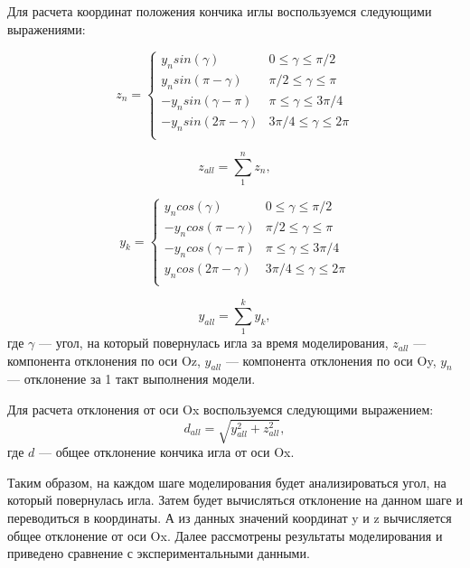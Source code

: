 \documentclass[10pt]{article}
\begin{document}
Для расчета координат положения кончика иглы воспользуемся следующими выражениями:

\begin{equation} \label{eq7}
z_{n} = 
 \begin{cases}
   y_{n} sin(\gamma) &{ 0 \leq \gamma \leq \pi/2 }\\
   y_{n} sin(\pi - \gamma) &{ \pi/2 \leq \gamma \leq \pi }\\
  - y_{n} sin( \gamma - \pi) &{ \pi \leq \gamma \leq 3\pi/4 }\\
   - y_{n} sin(2\pi -  \gamma) &{ 3\pi/4 \leq \gamma \leq 2\pi }\\
 \end{cases}
\end{equation}

\begin{equation} \label{eq8}
z_{all} = \sum\limits_{1}^{n} z_{n},
\end{equation}

\begin{equation} \label{eq9}
y_{k} = 
 \begin{cases}
   y_{n} cos(\gamma) &{ 0 \leq \gamma \leq \pi/2 }\\
   - y_{n} cos(\pi - \gamma) &{ \pi/2 \leq \gamma \leq \pi }\\
  - y_{n} cos( \gamma - \pi) &{ \pi \leq \gamma \leq 3\pi/4 }\\
    y_{n} cos(2\pi -  \gamma) &{ 3\pi/4 \leq \gamma \leq 2\pi }\\
 \end{cases}
\end{equation}

\begin{equation} \label{eq9}
y_{all} = \sum\limits_{1}^{k} y_{k},
\end{equation}
где $\gamma$ --- угол, на который повернулась игла за время моделирования, $z_{all} $ --- компонента отклонения по оси Oz, $y_{all}$ --- компонента отклонения по оси Oy, $y_{n}$ --- отклонение за 1 такт выполнения модели.

Для расчета отклонения от оси Ox воспользуемся следующими выражением:
\begin{equation} \label{eq10}
d_{all} = \sqrt{y_{all}^2  +  z_{all} ^2},
\end{equation}
где $d$ --- общее отклонение кончика игла от оси Ox.

Таким образом, на каждом шаге моделирования будет анализироваться угол, на который повернулась игла. Затем будет вычисляться отклонение на данном шаге и переводиться в координаты. А из данных значений координат y и z вычисляется общее отклонение от оси Ox.
Далее рассмотрены результаты моделирования и приведено сравнение с экспериментальными данными.
\end{document}
